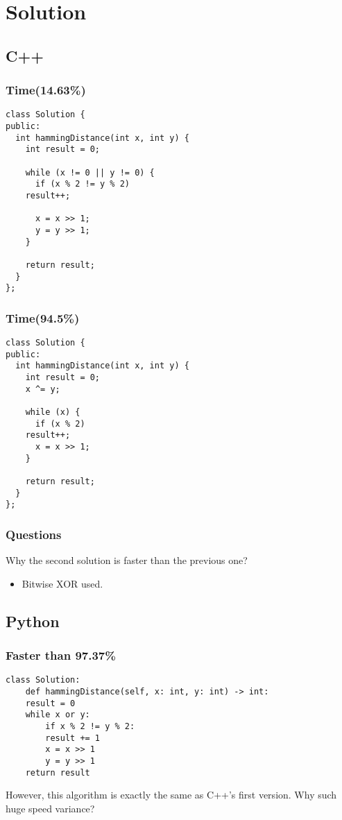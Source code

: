 \documentclass[12pt]{book}
\begin{document}
\section{Solution}
\label{sec:org15da427}
\subsection{C++}
\label{sec:orga5e433b}
\subsubsection{Time(14.63\%)}
\label{sec:org3b8a203}
\begin{verbatim}
class Solution {
public:
  int hammingDistance(int x, int y) {
    int result = 0;

    while (x != 0 || y != 0) {
      if (x % 2 != y % 2)
	result++;

      x = x >> 1;
      y = y >> 1;
    }

    return result;
  }
};
\end{verbatim}
\subsubsection{Time(94.5\%)}
\label{sec:org5664740}
\begin{verbatim}
class Solution {
public:
  int hammingDistance(int x, int y) {
    int result = 0;
    x ^= y;

    while (x) {
      if (x % 2)
	result++;
      x = x >> 1;
    }

    return result;
  }
};
\end{verbatim}
\subsubsection{Questions}
\label{sec:orgee3097b}
Why the second solution is faster than the previous one?
\begin{itemize}
\item Bitwise XOR used.
\end{itemize}
\subsection{Python}
\label{sec:orgbbdbddb}
\subsubsection{Faster than 97.37\%}
\label{sec:orgf4427d0}
\begin{verbatim}
class Solution:
    def hammingDistance(self, x: int, y: int) -> int:
	result = 0
	while x or y:
	    if x % 2 != y % 2:
		result += 1
	    x = x >> 1
	    y = y >> 1
	return result
\end{verbatim}
However, this algorithm is exactly the same as C++'s first version. Why such huge speed variance?
\end{document}
